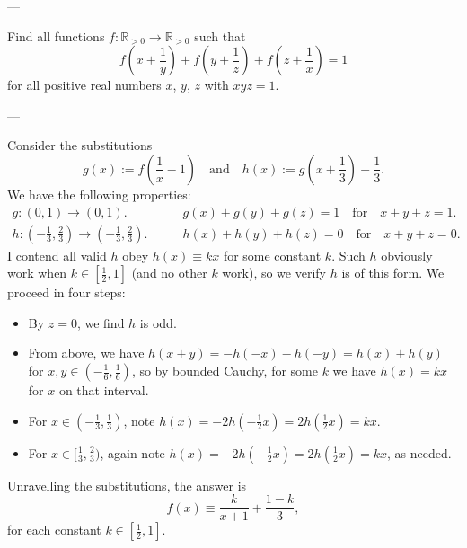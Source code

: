 
---

Find all functions $f:\mathbb R_{>0}\to\mathbb R_{>0}$ such that \[f\left(x+\frac1y\right)+f\left(y+\frac1z\right)+f\left(z+\frac1x\right)=1\]
for all positive real numbers $x$, $y$, $z$ with $xyz=1$.

---

Consider the substitutions \[g(x):=f\left(\frac1x-1\right)\quad\text{and}\quad h(x):=g\left(x+\frac13\right)-\frac13.\]
We have the following properties:
\begin{align*}
    g:(0,1)\to(0,1).&\qquad g(x)+g(y)+g(z)=1\quad\text{for}\quad x+y+z=1.\\
    h:(-\tfrac13,\tfrac23)\to(-\tfrac13,\tfrac23).&\qquad h(x)+h(y)+h(z)=0\quad\text{for}\quad x+y+z=0.
\end{align*}
I contend all valid $h$ obey $h(x)\equiv kx$ for some constant $k$. Such $h$ obviously work when $k\in[\tfrac12,1]$ (and no other $k$ work), so we verify $h$ is of this form. We proceed in four steps:
\begin{itemize}
    \item By $z=0$, we find $h$ is odd.
    \item From above, we have $h(x+y)=-h(-x)-h(-y)=h(x)+h(y)$ for $x,y\in(-\tfrac16,\tfrac16)$, so by bounded Cauchy, for some $k$ we have $h(x)=kx$ for $x$ on that interval.
    \item For $x\in(-\tfrac13,\tfrac13)$, note $h(x)=-2h(-\tfrac12x)=2h(\tfrac12x)=kx$.
    \item For $x\in[\tfrac13,\tfrac23)$, again note $h(x)=-2h(-\tfrac12x)=2h(\tfrac12x)=kx$, as needed.
\end{itemize}

Unravelling the substitutions, the answer is \[f(x)\equiv\frac k{x+1}+\frac{1-k}3,\]
for each constant $k\in[\tfrac12,1]$.
